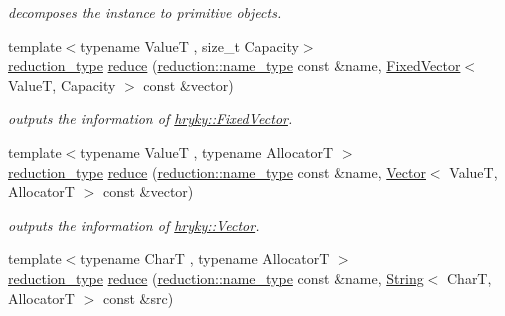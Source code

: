 \begin{DoxyCompactItemize}
\begin{DoxyCompactList}\small\item\em decomposes the instance to primitive objects. \end{DoxyCompactList}\item 
\hypertarget{namespacehryky_a8b6504070e437bb6817fefe0b6d6618c}{{\footnotesize template$<$typename Value\-T , size\-\_\-t Capacity$>$ }\\\hyperlink{namespacehryky_a343a9a4c36a586be5c2693156200eadc}{reduction\-\_\-type} \hyperlink{namespacehryky_a8b6504070e437bb6817fefe0b6d6618c}{reduce} (\hyperlink{namespacehryky_1_1reduction_ac686c30a4c8d196bbd0f05629a6b921f}{reduction\-::name\-\_\-type} const \&name, \hyperlink{classhryky_1_1_fixed_vector}{Fixed\-Vector}$<$ Value\-T, Capacity $>$ const \&vector)}\label{namespacehryky_a8b6504070e437bb6817fefe0b6d6618c}

\begin{DoxyCompactList}\small\item\em outputs the information of \hyperlink{classhryky_1_1_fixed_vector}{hryky\-::\-Fixed\-Vector}. \end{DoxyCompactList}\item 
\hypertarget{namespacehryky_a831f782cbe9d9e4dc64e4e185cf82e00}{{\footnotesize template$<$typename Value\-T , typename Allocator\-T $>$ }\\\hyperlink{namespacehryky_a343a9a4c36a586be5c2693156200eadc}{reduction\-\_\-type} \hyperlink{namespacehryky_a831f782cbe9d9e4dc64e4e185cf82e00}{reduce} (\hyperlink{namespacehryky_1_1reduction_ac686c30a4c8d196bbd0f05629a6b921f}{reduction\-::name\-\_\-type} const \&name, \hyperlink{classhryky_1_1_vector}{Vector}$<$ Value\-T, Allocator\-T $>$ const \&vector)}\label{namespacehryky_a831f782cbe9d9e4dc64e4e185cf82e00}

\begin{DoxyCompactList}\small\item\em outputs the information of \hyperlink{classhryky_1_1_vector}{hryky\-::\-Vector}. \end{DoxyCompactList}\item 
\hypertarget{namespacehryky_a152066a60658e596644dd53e09195097}{{\footnotesize template$<$typename Char\-T , typename Allocator\-T $>$ }\\\hyperlink{namespacehryky_a343a9a4c36a586be5c2693156200eadc}{reduction\-\_\-type} \hyperlink{namespacehryky_a152066a60658e596644dd53e09195097}{reduce} (\hyperlink{namespacehryky_1_1reduction_ac686c30a4c8d196bbd0f05629a6b921f}{reduction\-::name\-\_\-type} const \&name, \hyperlink{classhryky_1_1_string}{String}$<$ Char\-T, Allocator\-T $>$ const \&src)}\label{namespacehryky_a152066a60658e596644dd53e09195097}


\end{DoxyCompactItemize}
